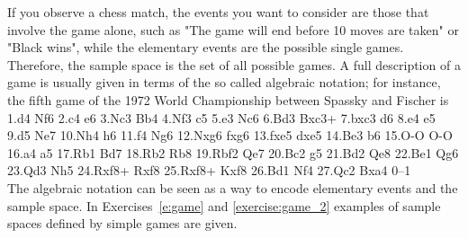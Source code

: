 \begin{example}
	If you observe a chess match, the events you want to consider are those that involve the game alone, such as "The game will end before 10 moves are taken" or "Black wins", while the elementary events are the possible single games. Therefore, the sample space is the set of all possible games. A full description of a game is usually given in terms of the so called algebraic notation; for instance, the fifth game of the 1972 World Championship between Spassky and Fischer is \\
	1.d4 Nf6 2.c4 e6 3.Nc3 Bb4 4.Nf3 c5 5.e3 Nc6 6.Bd3 Bxc3+ 7.bxc3 d6 8.e4 e5 9.d5 Ne7 10.Nh4 h6 11.f4 Ng6 12.Nxg6 fxg6 13.fxe5 dxe5 14.Be3 b6 15.O-O O-O 16.a4 a5 17.Rb1 Bd7 18.Rb2 Rb8 19.Rbf2 Qe7 20.Bc2 g5 21.Bd2 Qe8 22.Be1 Qg6 23.Qd3 Nh5 24.Rxf8+ Rxf8 25.Rxf8+ Kxf8 26.Bd1 Nf4 27.Qc2 Bxa4 0--1 \\
	The algebraic notation can be seen as a way to encode elementary events and the sample space. In Exercises~\ref{e:game} and \ref{exercise:game_2} examples of sample spaces defined by simple games are given. 
\end{example}




